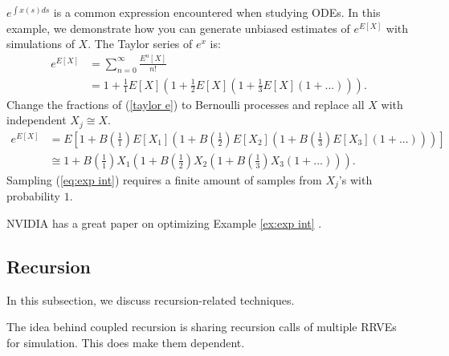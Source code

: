 \documentclass[a4paper,12pt]{article}
\begin{document}
\begin{example}[$e^{E[X]}$] \label{ex:exp int}
  $e^{\int x(s)ds}$ is a common expression encountered when studying ODEs.
  In this example, we demonstrate how you can generate unbiased estimates of
  $e^{E[X]}$ with simulations of $X$. The Taylor series of $e^{x}$ is:
  \begin{align}
    e^{E[X]} & = \sum_{n=0}^{\infty} \frac{E^{n}[X]}{n!}     \\
             & = 1 + \frac{1}{1}E[X]\left(1+ \frac{1}{2}E[X]
    \left(1+\frac{1}{3}E[X]\left(1+ ...\right)\right)\right). \label{taylor e}
  \end{align}
  Change the fractions of (\ref{taylor e}) to Bernoulli processes
  and replace all $X$ with independent $X_j \cong X$.
  \begin{align}
    e^{E[X]} & = E
    \left[1 + B\left(\frac{1}{1}\right)E[X_1]
    \left(1+ B\left(\frac{1}{2}\right)E[X_2]
    \left(1+B\left(\frac{1}{3}\right)E[X_3]
    \left(1+ ...\right)
    \right)
    \right)
    \right]                             \\
             & \cong \label{eq:exp int}
    1 + B\left(\frac{1}{1}\right)X_1
    \left(1+ B\left(\frac{1}{2}\right)X_2
    \left(1+B\left(\frac{1}{3}\right)X_3
      \left(1+ ...\right)
      \right)
    \right).
  \end{align}
  Sampling (\ref{eq:exp int}) requires a finite amount of samples from $X_{j}$'s
  with probability $1$.
\end{example}

\begin{related}
  NVIDIA has a great paper on optimizing Example \ref{ex:exp int}
  \cite{kettunen_unbiased_2021}.
\end{related}

\subsection{Recursion}

In this subsection, we discuss recursion-related techniques.

\begin{technique}
  The idea behind coupled recursion is sharing recursion calls of
  multiple RRVEs for simulation. This does make them dependent.
\end{technique}
\end{document}
